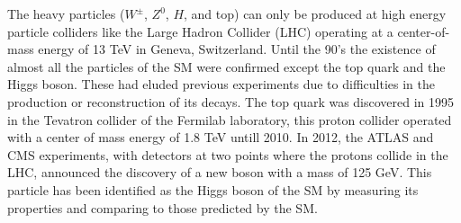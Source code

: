 \documentclass[final,3p]{CSP}
\begin{document}


The heavy particles ($W^{\pm}$, $Z^0$, $H$, and top) can only be produced at high energy particle colliders like the Large Hadron Collider (LHC) operating at a center-of-mass energy of 13 TeV in Geneva, Switzerland.
Until the 90's the existence of almost all the particles of the SM were confirmed except the top quark and the Higgs boson. 
These had eluded previous experiments due to difficulties in the production or reconstruction of its decays.
The top quark was discovered in 1995 in the Tevatron collider of the Fermilab laboratory, this proton collider operated with a center of mass energy of 1.8 TeV untill 2010.
In 2012, the ATLAS and CMS experiments, with detectors at two points where the protons collide in the LHC, announced the discovery of a new boson with a mass of 125 GeV.
This particle has been identified as the Higgs boson of the SM by measuring its properties and comparing to those predicted by the SM.
\end{document}
